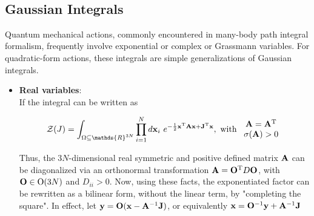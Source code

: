 \documentclass{homework}
\begin{document}
\blanky \\

\subsection{Gaussian Integrals}
 
Quantum mechanical actions, commonly encountered in many-body path integral formalism, frequently involve exponential or complex or Grassmann variables. For quadratic-form actions, these integrals are simple generalizations of Gaussian integrals. 

\begin{itemize}
    \item \textbf{Real variables}: \\
    
    If the integral can be written as 
    
    \begin{equation}
        \mathcal{Z}(J) = \int_{\Omega \subseteq \mathds{R}^{3N}} \prod_{i=1}^{N} d{{\bf x}}_i \blanky e^{-\frac{1}{2} {{\bf x}}^{\textnormal{T}} {{\bf A}} {{\bf x}} + {{\bf J}}^{\textnormal{T}} {{\bf x}}}, \textnormal{ with } \begin{array}{c}
            {{\bf A}} = {{\bf A}}^{\textnormal{T}} \\
            \sigma({{\bf A}}) > 0 
        \end{array}
    \end{equation}

Thus, the $3N$-dimensional real symmetric and positive defined matrix ${{{\bf A}}}$ can be diagonalized via an orthonormal transformation ${{\bf A}} = {{\bf O}}^{\textnormal{T}} D  {{\bf O}}$, with $ {{\bf O}} \in \textnormal{O}(3N)$ and $D_{ii} > 0$. Now, using these facts, the exponentiated factor can be rewritten as a bilinear form, without the linear term, by "completing the square". In effect, let ${{\bf y}} = {{\bf O} ({\bf x} - {\bf A}^{-1} {\bf J})}$, or equivalently ${\bf x} = {\bf O}^{-1} {\bf y} + {\bf A}^{-1} {\bf J}$


\end{itemize}
\end{document}
